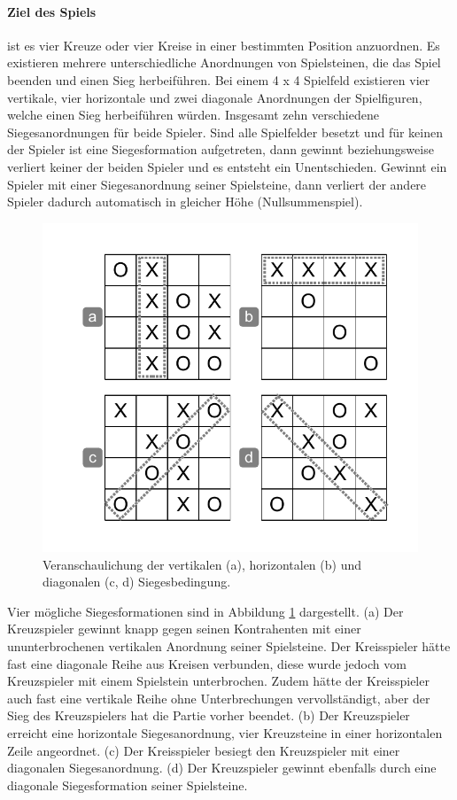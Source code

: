 \paragraph{Ziel des Spiels} ist es vier Kreuze oder vier Kreise in einer bestimmten Position anzuordnen. Es existieren mehrere unterschiedliche Anordnungen von Spielsteinen, die das Spiel beenden und einen Sieg herbeiführen. Bei einem 4 x 4 Spielfeld existieren vier vertikale, vier horizontale und zwei diagonale Anordnungen der Spielfiguren, welche einen Sieg herbeiführen würden. Insgesamt zehn verschiedene Siegesanordnungen für beide Spieler. Sind alle Spielfelder besetzt und für keinen der Spieler ist eine Siegesformation aufgetreten, dann gewinnt beziehungsweise verliert keiner der beiden Spieler und es entsteht ein Unentschieden. Gewinnt ein Spieler mit einer Siegesanordnung seiner Spielsteine, dann verliert der andere Spieler dadurch automatisch in gleicher Höhe (Nullsummenspiel). \\

\begin{figure}[!htbp]
  \centering
  \includegraphics[scale = 1]{inhalt/abbildungen/siegesbedingungen_tictactoe.pdf}
  \caption{Veranschaulichung der vertikalen (a), horizontalen (b) und diagonalen (c, d) Siegesbedingung.}
  \label{fig:siegesbedingungen_tictactoe}
\end{figure}

Vier mögliche Siegesformationen sind in Abbildung \ref{fig:siegesbedingungen_tictactoe} dargestellt. (a) Der Kreuzspieler gewinnt knapp gegen seinen Kontrahenten mit einer ununterbrochenen vertikalen Anordnung seiner Spielsteine. Der Kreisspieler hätte fast eine diagonale Reihe aus Kreisen verbunden, diese wurde jedoch vom Kreuzspieler mit einem Spielstein unterbrochen. Zudem hätte der Kreisspieler auch fast eine vertikale Reihe ohne Unterbrechungen vervollständigt, aber der Sieg des Kreuzspielers hat die Partie vorher beendet. (b) Der Kreuzspieler erreicht eine horizontale Siegesanordnung, vier Kreuzsteine in einer horizontalen Zeile angeordnet. (c) Der Kreisspieler besiegt den Kreuzspieler mit einer diagonalen Siegesanordnung. (d) Der Kreuzspieler gewinnt ebenfalls durch eine diagonale Siegesformation seiner Spielsteine. 

